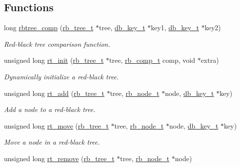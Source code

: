 \subsection*{Functions}
\begin{CompactItemize}
\item 
long \hyperlink{group__dbprim__rbtree_ga5}{rbtree\_\-comp} (\hyperlink{struct__rb__tree__s}{rb\_\-tree\_\-t} $\ast$tree, \hyperlink{struct__db__key__s}{db\_\-key\_\-t} $\ast$key1, \hyperlink{struct__db__key__s}{db\_\-key\_\-t} $\ast$key2)
\begin{CompactList}\small\item\em Red-black tree comparison function. \item\end{CompactList}\item 
unsigned long \hyperlink{group__dbprim__rbtree_ga6}{rt\_\-init} (\hyperlink{struct__rb__tree__s}{rb\_\-tree\_\-t} $\ast$tree, \hyperlink{group__dbprim__rbtree_ga3}{rb\_\-comp\_\-t} comp, void $\ast$extra)
\begin{CompactList}\small\item\em Dynamically initialize a red-black tree. \item\end{CompactList}\item 
unsigned long \hyperlink{group__dbprim__rbtree_ga7}{rt\_\-add} (\hyperlink{struct__rb__tree__s}{rb\_\-tree\_\-t} $\ast$tree, \hyperlink{struct__rb__node__s}{rb\_\-node\_\-t} $\ast$node, \hyperlink{struct__db__key__s}{db\_\-key\_\-t} $\ast$key)
\begin{CompactList}\small\item\em Add a node to a red-black tree. \item\end{CompactList}\item 
unsigned long \hyperlink{group__dbprim__rbtree_ga8}{rt\_\-move} (\hyperlink{struct__rb__tree__s}{rb\_\-tree\_\-t} $\ast$tree, \hyperlink{struct__rb__node__s}{rb\_\-node\_\-t} $\ast$node, \hyperlink{struct__db__key__s}{db\_\-key\_\-t} $\ast$key)
\begin{CompactList}\small\item\em Move a node in a red-black tree. \item\end{CompactList}\item 
unsigned long \hyperlink{group__dbprim__rbtree_ga9}{rt\_\-remove} (\hyperlink{struct__rb__tree__s}{rb\_\-tree\_\-t} $\ast$tree, \hyperlink{struct__rb__node__s}{rb\_\-node\_\-t} $\ast$node)

\end{CompactItemize}
